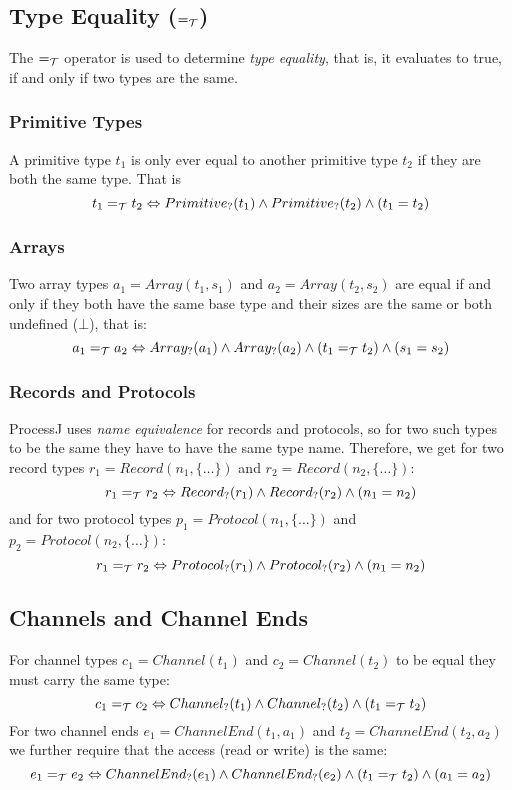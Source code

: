 \documentclass[pdflatex,11pt,letter]{article}
\newcommand{\te}{=_{\cal T}}
\begin{document}
\subsection{Type Equality ($\te$)}

The $\te$ operator is used to determine {\em type equality}, that is, it evaluates to true, if and only if two types are the same.

\subsubsection{Primitive Types}

A primitive type $t_1$ is only ever equal to another primitive type $t_2$ if they are both the same type. That is
\[
t_1 \te t_2 \Leftrightarrow Primitive_?(t_1) \wedge Primitive_?(t_2) \wedge (t_1 = t_2)
\]

\subsubsection{Arrays}

Two array types $a_1 = Array(t_1, s_1)$ and $a_2 = Array(t_2, s_2)$ are equal if and only if they both have the same base type and their sizes are the same or both undefined ($\bot$), that is:
\[
a_1 \te a_2 \Leftrightarrow Array_?(a_1) \wedge Array_?(a_2) \wedge (t_1 \te t_2) \wedge (s_1 = s_2)
\]

\subsubsection{Records and Protocols}

ProcessJ uses {\em name equivalence} for records and protocols, so for two such types to be the same they have to have the same type name. Therefore, we get for two record types $r_1 = Record(n_1,\{\ldots\})$ and $r_2 = Record(n_2,\{\ldots\})$:
\[
r_1 \te r_2 \Leftrightarrow Record_?(r_1) \wedge Record_?(r_2) \wedge (n_1 = n_2)
\]
and for two protocol types $p_1 = Protocol(n_1,\{\ldots\})$ and $p_2 = Protocol(n_2,\{\ldots\})$:
\[
r_1 \te r_2 \Leftrightarrow Protocol_?(r_1) \wedge Protocol_?(r_2) \wedge (n_1 = n_2)
\]

\subsection{Channels and Channel Ends}

For channel types $c_1 = Channel(t_1)$ and $c_2 = Channel(t_2)$ to be equal they must carry the same type:
\[
c_1 \te c_2 \Leftrightarrow Channel_?(t_1) \wedge Channel_?(t_2) \wedge (t_1 \te t_2)
\]
For two channel ends $e_1 = ChannelEnd(t_1, a_1)$ and $t_2 = ChannelEnd(t_2, a_2)$ we further require that the access (read or write) is the same:
\[
e_1 \te e_2 \Leftrightarrow ChannelEnd_?(e_1) \wedge ChannelEnd_?(e_2) \wedge (t_1 \te t_2) \wedge (a_1 = a_2)
\]
\end{document}
